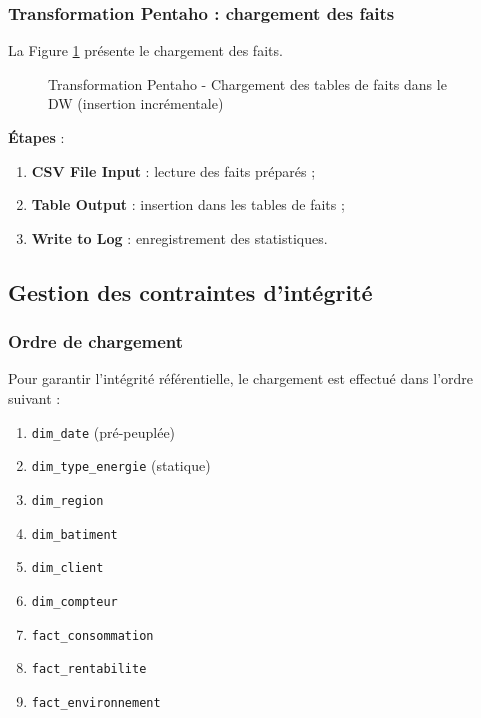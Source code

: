 \documentclass[12pt,a4paper]{report}
\begin{document}
\subsubsection{Transformation Pentaho : chargement des faits}

La Figure \ref{fig:chargement_faits} présente le chargement des faits.

\begin{figure}[H]
    \centering
    \caption{Transformation Pentaho - Chargement des tables de faits dans le DW (insertion incrémentale)}
    \label{fig:chargement_faits}
\end{figure}

\textbf{Étapes} :
\begin{enumerate}
    \item \textbf{CSV File Input} : lecture des faits préparés ;
    \item \textbf{Table Output} : insertion dans les tables de faits ;
    \item \textbf{Write to Log} : enregistrement des statistiques.
\end{enumerate}

\subsection{Gestion des contraintes d'intégrité}

\subsubsection{Ordre de chargement}

Pour garantir l'intégrité référentielle, le chargement est effectué dans l'ordre suivant :

\begin{enumerate}
    \item \texttt{dim\_date} (pré-peuplée)
    \item \texttt{dim\_type\_energie} (statique)
    \item \texttt{dim\_region}
    \item \texttt{dim\_batiment}
    \item \texttt{dim\_client}
    \item \texttt{dim\_compteur}
    \item \texttt{fact\_consommation}
    \item \texttt{fact\_rentabilite}
    \item \texttt{fact\_environnement}
\end{enumerate}
\end{document}
